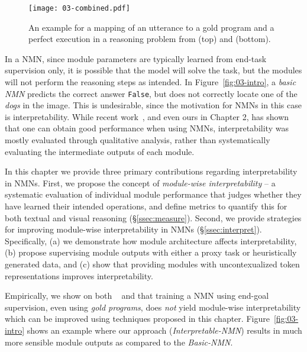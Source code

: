 \documentclass[main.tex]{subfiles}
\begin{document}
\begin{figure}[tbh]
\centering
    \texttt{[image: 03-combined.pdf]}
    \caption{An example for a mapping of an utterance to a gold program and a perfect execution in a reasoning problem from \nlvr{} (top) and \drop{} (bottom).}
 \label{fig:03-nmn-example}
\end{figure}

In a NMN, since module parameters are typically learned from end-task supervision only, it is possible that the model will solve the task, but the modules will not perform the reasoning steps as intended. In Figure~\ref{fig:03-intro}, a \emph{basic NMN} predicts the correct answer \texttt{False}, but does not correctly locate one of the \emph{dogs} in the image. This is undesirable, since the motivation for NMNs in this case is interpretability.
While recent work~\cite{explainablenmn-hu-2018,jiang-nmn-2019}, and even ours in Chapter 2, has shown that one can obtain good performance when using NMNs, interpretability was mostly evaluated through qualitative analysis, rather than systematically evaluating the intermediate outputs of each module.

In this chapter we provide three primary contributions regarding interpretability in NMNs.
First, we propose the concept of \emph{module-wise interpretability} -- a systematic evaluation of individual module performance that judges whether they have learned their intended operations, and define metrics to quantify this for both textual and visual reasoning (\S\ref{ssec:measure}).
Second, we provide strategies for improving module-wise interpretability in NMNs (\S\ref{ssec:interpret}).
Specifically, (a) we demonstrate how module architecture affects interpretability,
(b) propose supervising module outputs with either a proxy task or heuristically generated data, and (c)
show that providing modules with uncontexualized token representations improves interpretability.

Empirically, we show on both \nlvr{}~\cite{nlvr2-suhr-2018} and \drop{} \cite{drop-2019} that training a NMN using end-goal supervision, even using \emph{gold programs}, does \emph{not} yield module-wise interpretability which can be improved using techniques proposed in this chapter.
Figure~\ref{fig:03-intro} shows an example where our approach (\emph{Interpretable-NMN}) results in much more sensible module outputs as compared to the \emph{Basic-NMN}.
\end{document}
